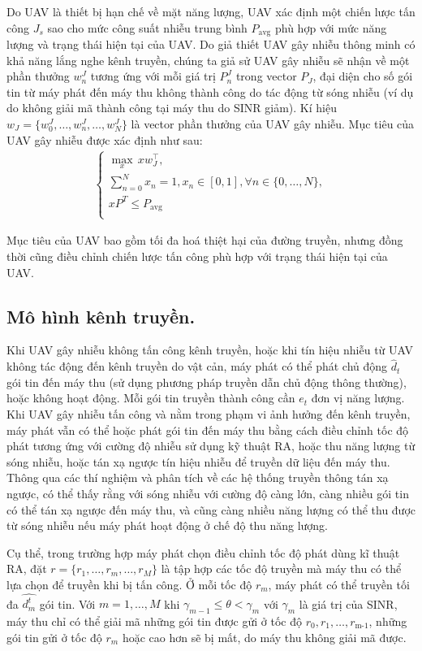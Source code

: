 \documentclass{uetgraduation}
\begin{document}
Do UAV là thiết bị hạn chế về mặt năng lượng, UAV xác định một chiến lược tấn công $J_s$ sao cho mức công suất nhiễu trung bình $P_\text{avg}$ phù hợp với mức năng lượng và trạng thái hiện tại của UAV.
Do giả thiết UAV gây nhiễu thông minh có khả năng lắng nghe kênh truyền, chúng ta giả sử UAV gây nhiễu sẽ nhận về một phần thưởng $w_n^J$ tương ứng với mỗi giá trị $P_n^J$ trong vector $P_J$, đại diện
cho số gói tin từ máy phát đến máy thu không thành công do tác động từ sóng nhiễu (ví dụ do không giải mã thành công tại máy thu do SINR giảm). Kí hiệu $w_J = \{w_0^J, \dots, w_n^J, \dots, w_N^J\}$
là vector phần thưởng của UAV gây nhiễu. Mục tiêu của UAV gây nhiễu được xác định như sau:
\begin{align*}
    \begin{cases}
        \underset{x}{\max} \, x w_J^\top, \\
        \sum_{n=0}^{N} x_n = 1, x_n \in [0, 1], \forall n \in \{0, \dots, N\}, \\
        x P^T \leq P_\text{avg} \\
    \end{cases}
\end{align*}

Mục tiêu của UAV bao gồm tối đa hoá thiệt hại của đường truyền, nhưng đồng thời cũng điều chỉnh chiến lược tấn công phù hợp với trạng thái hiện tại của UAV.

\subsection{Mô hình kênh truyền.}
Khi UAV gây nhiễu không tấn công kênh truyền, hoặc khi tín hiệu nhiễu từ UAV không tác động đến kênh truyền do vật cản, máy phát có thể phát chủ động $\hat{d}_t$
gói tin đến máy thu (sử dụng phương pháp truyền dẫn chủ động thông thường), hoặc không hoạt động. Mỗi gói tin truyền thành công cần $e_t$ đơn vị năng lượng.
Khi UAV gây nhiễu tấn công và nằm trong phạm vi ảnh hưởng đến kênh truyền, máy phát vẫn có thể hoặc phát gói tin đến máy thu bằng cách điều chỉnh tốc độ phát tương
ứng với cường độ nhiễu sử dụng kỹ thuật RA, hoặc thu năng lượng từ sóng nhiễu, hoặc tán xạ ngược tín hiệu nhiễu để truyền dữ liệu đến máy thu. Thông qua các thí nghiệm
và phân tích về các hệ thống truyền thông tán xạ ngược, có thể thấy rằng với sóng nhiễu với cường độ càng lớn, càng nhiều gói tin có thể tán xạ ngược đến máy thu, và cũng
càng nhiều năng lượng có thể thu được từ sóng nhiễu nếu máy phát hoạt động ở chế độ thu năng lượng. 

Cụ thể, trong trường hợp máy
phát chọn điều chỉnh tốc độ phát dùng kĩ thuật RA, đặt $r = \{r_1, \dots, r_m,\dots, r_M\}$ là tập hợp các tốc độ truyền mà máy thu có thể lựa chọn để truyền khi bị tấn
công. Ở mỗi tốc độ $r_m$, máy phát có thể truyền tối đa $\hat{d_m^t}$ gói tin. Với $m = 1, \dots, M$ khi $\gamma_{m-1} \leq \theta < \gamma_m$ với $\gamma_m$ là giá
trị của SINR, máy thu chỉ có thể giải mã những gói tin được gửi ở tốc độ $r_0, r_1, \dots, r_\text{m-1}$, những gói tin gửi ở tốc độ $r_m$ hoặc cao hơn sẽ bị mất,
do máy thu không giải mã được. 
\end{document}
